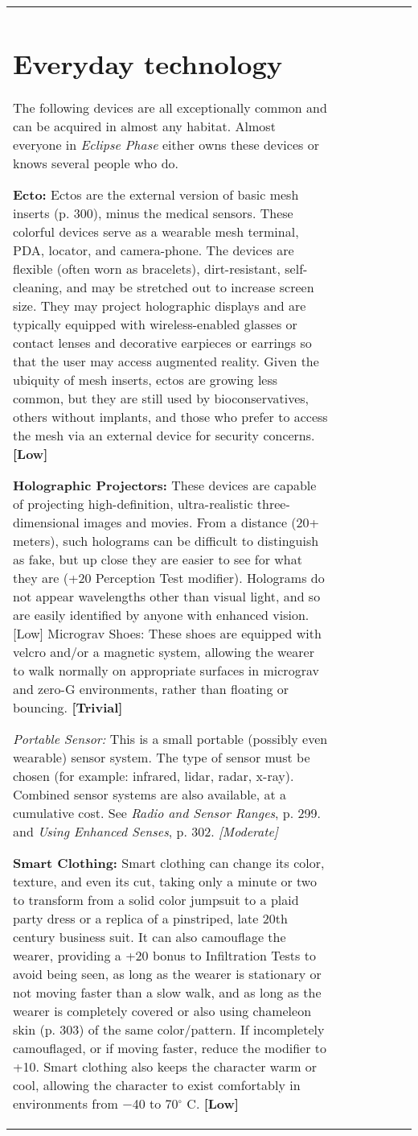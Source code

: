 \begin{tabular}{|l|l|l|l|l|l|l|}
\section{Everyday technology} \label{sec:everyday-tech} 

The following devices are all exceptionally common and can be acquired in almost any habitat. Almost everyone in \emph{Eclipse Phase} either owns these devices or knows several people who do. 

\textbf{Ecto:} Ectos are the external version of basic mesh inserts (p. 300), minus the medical sensors. These colorful devices serve as a wearable mesh terminal, PDA, locator, and camera-phone. The devices are flexible (often worn as bracelets), dirt-resistant, self-cleaning, and may be stretched out to increase screen size. They may project holographic displays and are typically equipped with wireless-enabled glasses or contact lenses and decorative earpieces or earrings so that the user may access augmented reality. Given the ubiquity of mesh inserts, ectos are growing less common, but they are still used by bioconservatives, others without implants, and those who prefer to access the mesh via an external device for security concerns. \textbf{[Low]} 

\textbf{Holographic Projectors:} These devices are capable of projecting high-definition, ultra-realistic three-dimensional images and movies. From a distance (20+ meters), such holograms can be difficult to distinguish as fake, but up close they are easier to see for what they are (+20 Perception Test modifier). Holograms do not appear wavelengths other than visual light, and so are easily identified by anyone with enhanced vision. [Low] Micrograv Shoes: These shoes are equipped with velcro and/or a magnetic system, allowing the wearer to walk normally on appropriate surfaces in micrograv and zero-G environments, rather than floating or bouncing. \textbf{[Trivial]} 

\emph{Portable Sensor:} This is a small portable (possibly even wearable) sensor system. The type of sensor must be chosen (for example: infrared, lidar, radar, x-ray). Combined sensor systems are also available, at a cumulative cost. See \emph{Radio and Sensor Ranges}, p. 299. and \emph{Using Enhanced Senses}, p. 302. \emph{[Moderate]} 

\textbf{Smart Clothing:} Smart clothing can change its color, texture, and even its cut, taking only a minute or two to transform from a solid color jumpsuit to a plaid party dress or a replica of a pinstriped, late 20th century business suit. It can also camouflage the wearer, providing a +20 bonus to Infiltration Tests to avoid being seen, as long as the wearer is stationary or not moving faster than a slow walk, and as long as the wearer is completely covered or also using chameleon skin (p. 303) of the same color/pattern. If incompletely camouflaged, or if moving faster, reduce the modifier to +10. Smart clothing also keeps the character warm or cool, allowing the character to exist comfortably in environments from $-$40 to 70$^{\circ}$ C. \textbf{[Low]} 


\end{tabular}
